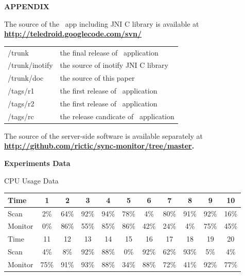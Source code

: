 \appendix
\onecolumn
\begin{center}
{\bf APPENDIX} 

\vspace{0.2in}


The source of the \teledroid\ app including JNI C library is available at \\ \textbf{\url{http://teledroid.googlecode.com/svn/}}\\
\begin{tabular}{ l l }
/trunk				& the final release of \teledroid\ application	\\
/trunk/inotify	& the source of inotify JNI C library \\
/trunk/doc		& the source of this paper	\\
/tags/r1			& the first release of \teledroid\ application \\
/tags/r2			& the first release of \teledroid\ application \\
/tags/rc			& the release candicate of \teledroid\ application \\
\end{tabular}

\vspace{0.2in}

The source of the server-side software is available separately at \\
\textbf{\url{http://github.com/rictic/sync-monitor/tree/master}.}

\vspace{0.2in}
\textbf{Experiments Data }

\vspace{0.05in}
CPU Usage Data

\begin{tabular}{ | l || c | c | c | c | c | c | c | c | c | c | }
    \hline
Time 	& 1  & 2	 & 3 	& 4 	& 5 	& 6 	& 7 	& 8 	& 9 	& 10	 	\\ \hline\hline
Scan	& 2\% & 64\% & 92\%	& 94\% 	& 78\% 	& 4\%	& 80\%	& 91\%	& 92\%	& 16\% 	  	\\ \hline
Monitor	& 0\% & 86\% & 55\%	& 85\% 	& 86\% 	& 42\%	& 24\%	& 4\%	& 75\%	& 45\% 		\\ \hline\hline

Time 	& 11 & 12	 & 13	& 14	& 15	& 16 	& 17 	& 18 	& 19 	& 20 		\\ \hline\hline
Scan	& 4\% & 8\%	 & 92\%	& 88\% 	& 0\% 	& 92\%	& 62\%	& 93\%	& 5\%	& 4\%  		\\ \hline
Monitor	&75\% & 91\% & 93\%	& 88\%	& 34\% 	& 88\%	& 72\%	& 41\%	& 92\%	& 77\%  		\\ \hline\hline


\end{tabular}
\end{center}
